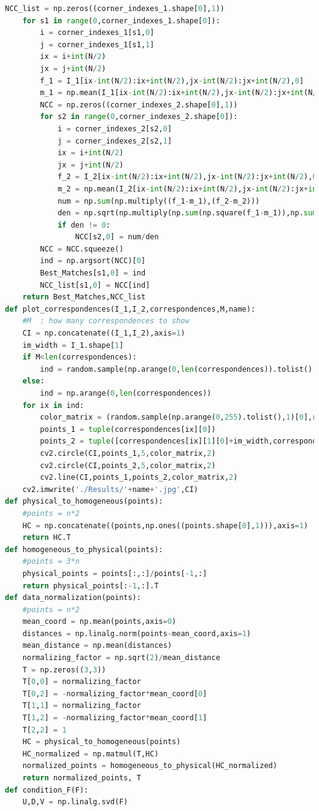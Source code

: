 \documentclass{article}
\begin{document}
\begin{lstlisting}[language=Python]
	NCC_list = np.zeros((corner_indexes_1.shape[0],1))
	for s1 in range(0,corner_indexes_1.shape[0]):
		i = corner_indexes_1[s1,0]
		j = corner_indexes_1[s1,1]
		ix = i+int(N/2)
		jx = j+int(N/2)
		f_1 = I_1[ix-int(N/2):ix+int(N/2),jx-int(N/2):jx+int(N/2),0]
		m_1 = np.mean(I_1[ix-int(N/2):ix+int(N/2),jx-int(N/2):jx+int(N/2),0])
		NCC = np.zeros((corner_indexes_2.shape[0],1))
		for s2 in range(0,corner_indexes_2.shape[0]):
			i = corner_indexes_2[s2,0]
			j = corner_indexes_2[s2,1]
			ix = i+int(N/2)
			jx = j+int(N/2)
			f_2 = I_2[ix-int(N/2):ix+int(N/2),jx-int(N/2):jx+int(N/2),0]
			m_2 = np.mean(I_2[ix-int(N/2):ix+int(N/2),jx-int(N/2):jx+int(N/2),0])
			num = np.sum(np.multiply((f_1-m_1),(f_2-m_2)))
			den = np.sqrt(np.multiply(np.sum(np.square(f_1-m_1)),np.sum(np.square(f_2-m_2))))
			if den != 0:
				NCC[s2,0] = num/den
		NCC = NCC.squeeze()
		ind = np.argsort(NCC)[0]
		Best_Matches[s1,0] = ind
		NCC_list[s1,0] = NCC[ind]
	return Best_Matches,NCC_list
def plot_correspondences(I_1,I_2,correspondences,M,name):
	#M	: how many correspondences to show
	CI = np.concatenate((I_1,I_2),axis=1)
	im_width = I_1.shape[1]
	if M<len(correspondences):
		ind = random.sample(np.arange(0,len(correspondences)).tolist(),M)
	else:
		ind = np.arange(0,len(correspondences))
	for ix in ind:
		color_matrix = (random.sample(np.arange(0,255).tolist(),1)[0],random.sample(np.arange(0,255).tolist(),1)[0],random.sample(np.arange(0,255).tolist(),1)[0])
		points_1 = tuple(correspondences[ix][0])
		points_2 = tuple([correspondences[ix][1][0]+im_width,correspondences[ix][1][1]])
		cv2.circle(CI,points_1,5,color_matrix,2)
		cv2.circle(CI,points_2,5,color_matrix,2)
		cv2.line(CI,points_1,points_2,color_matrix,2)
	cv2.imwrite('./Results/'+name+'.jpg',CI)
def physical_to_homogeneous(points):
	#points = n*2
	HC = np.concatenate((points,np.ones((points.shape[0],1))),axis=1)
	return HC.T
def homogeneous_to_physical(points):
	#points = 3*n
	physical_points = points[:,:]/points[-1,:]
	return physical_points[:-1,:].T
def data_normalization(points):
	#points = n*2
	mean_coord = np.mean(points,axis=0)
	distances = np.linalg.norm(points-mean_coord,axis=1)
	mean_distance = np.mean(distances)
	normalizing_factor = np.sqrt(2)/mean_distance
	T = np.zeros((3,3))
	T[0,0] = normalizing_factor
	T[0,2] = -normalizing_factor*mean_coord[0]
	T[1,1] = normalizing_factor
	T[1,2] = -normalizing_factor*mean_coord[1]
	T[2,2] = 1
	HC = physical_to_homogeneous(points)
	HC_normalized = np.matmul(T,HC)
	normalized_points = homogeneous_to_physical(HC_normalized)
	return normalized_points, T
def condition_F(F):
	U,D,V = np.linalg.svd(F)

\end{lstlisting}
\end{document}
